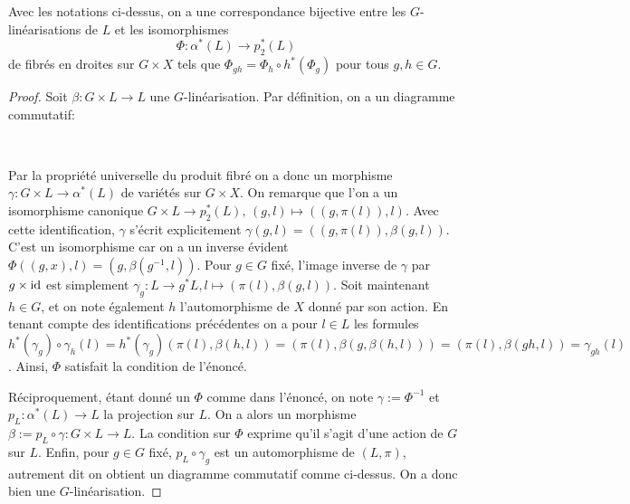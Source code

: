 \begin{lem}\label{CritereExistenceGLin}
Avec les notations ci-dessus, on a une correspondance bijective entre les $G$-linéarisations de $L$ et les isomorphismes
$$\Phi: \alpha^*(L)\rightarrow p_2^*(L)$$
de fibrés en droites sur $G\times X$ tels que $\Phi_{gh}=\Phi_h\circ h^*(\Phi_g)$ pour tous $g,h\in G$.
\end{lem}
\begin{proof}
Soit $\beta:G\times L\rightarrow L$ une $G$-linéarisation. Par définition, on a un diagramme commutatif:
	\begin{center}
	\\
	\end{center}
Par la propriété universelle du produit fibré on a donc un morphisme $\gamma:G\times L\rightarrow\alpha^*(L)$ de variétés sur $G\times X$. On remarque que l'on a un isomorphisme canonique $G\times L\rightarrow p_2^*(L),\, (g,l)\mapsto ((g,\pi (l)),l)$. Avec cette identification, $\gamma$ s'écrit explicitement $\gamma(g,l)=((g,\pi(l)),\beta(g,l))$. C'est un isomorphisme car on a un inverse évident $\Phi((g,x),l)=(g,\beta(g^{-1},l))$. Pour $g\in G$ fixé, l'image inverse de $\gamma$ par $g\times \operatorname{id}$ est simplement $\gamma_g:L\rightarrow g^*L, l\mapsto (\pi(l),\beta(g,l))$. Soit maintenant $h\in G$, et on note également $h$ l'automorphisme de $X$ donné par son action. En tenant compte des identifications précédentes on a pour $l\in L$ les formules $h^*(\gamma_g)\circ\gamma_h(l)=h^*(\gamma_g)(\pi(l),\beta(h,l))=(\pi(l),\beta(g,\beta(h,l)))=(\pi(l),\beta(gh,l))=\gamma_{gh}(l)$. Ainsi, $\Phi$ satisfait la condition de l'énoncé.

Réciproquement, étant donné un $\Phi$ comme dans l'énoncé, on note $\gamma:=\Phi^{-1}$ et $p_L:\alpha^*(L)\rightarrow L$ la projection sur $L$. On a alors un morphisme $\beta:=p_L\circ\gamma : G\times L \rightarrow L$. La condition sur $\Phi$ exprime qu'il s'agit d'une action de $G$  sur $L$. Enfin, pour $g\in G$ fixé, $p_L\circ \gamma_g$ est un automorphisme de $(L,\pi)$, autrement dit on obtient un diagramme commutatif comme ci-dessus. On a donc bien une $G$-linéarisation.
\end{proof}

